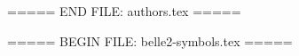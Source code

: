   \author{R.~\v{Z}leb\v{c}\'{i}k\,}

===== END FILE: authors.tex =====

===== BEGIN FILE: belle2-symbols.tex =====






\RequirePackage{xspace}
\RequirePackage{relsize}




\def\belletwo{\mbox{Belle~II}\xspace}
\def\belle  {\mbox{Belle}\xspace}
\def\lhcb {\mbox{LHCb}\xspace}

\def\babar{\mbox{\slshape B\kern-0.1em{\smaller A}\kern-0.1em
    B\kern-0.1em{\smaller A\kern-0.2em R}}\xspace}




